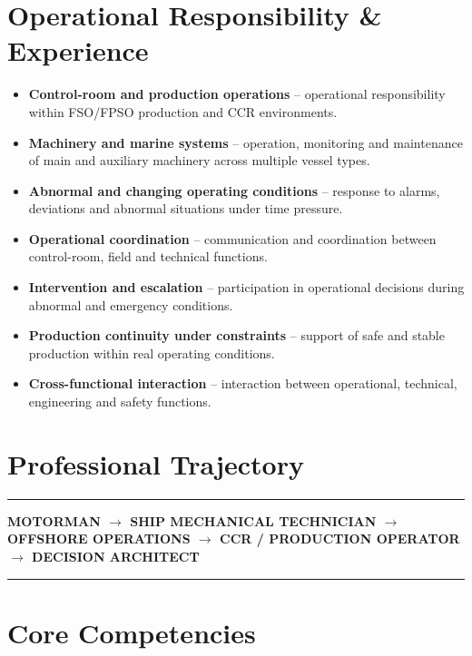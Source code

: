 \documentclass[11pt,a4paper]{article}
\newcommand{\sectionline}{%
    \vspace{0.2em}
    {\color{avcsgold}\rule{\textwidth}{0.8pt}}
    \vspace{0.2em}
}
\newcommand{\trajectory}[1]{%
    \sectionline
    \vspace{0.4em}
    \begin{center}
        \small\bfseries\color{avcsdark}
        #1
    \end{center}
    \vspace{0.4em}
    \sectionline
    \vspace{0.8em}
}
\begin{document}
\section*{Operational Responsibility \& Experience}

\begin{itemize}[leftmargin=*, nosep, itemsep=2pt]
    \item \textbf{Control-room and production operations} -- operational responsibility within FSO/FPSO production and CCR environments.
    \item \textbf{Machinery and marine systems} -- operation, monitoring and maintenance of main and auxiliary machinery across multiple vessel types.
    \item \textbf{Abnormal and changing operating conditions} -- response to alarms, deviations and abnormal situations under time pressure.
    \item \textbf{Operational coordination} -- communication and coordination between control-room, field and technical functions.
    \item \textbf{Intervention and escalation} -- participation in operational decisions during abnormal and emergency conditions.
    \item \textbf{Production continuity under constraints} -- support of safe and stable production within real operating conditions.
    \item \textbf{Cross-functional interaction} -- interaction between operational, technical, engineering and safety functions.
\end{itemize}

\section*{Professional Trajectory}

\trajectory{MOTORMAN $\rightarrow$ SHIP MECHANICAL TECHNICIAN $\rightarrow$ OFFSHORE OPERATIONS $\rightarrow$ CCR / PRODUCTION OPERATOR $\rightarrow$ DECISION ARCHITECT}

\section*{Core Competencies}
\end{document}

